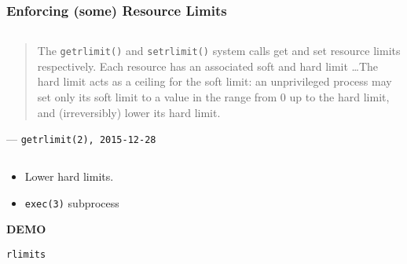 \begin{frame}

\frametitle{Enforcing (some) Resource Limits}

\begin{columns}

\column{\dimexpr\paperwidth-50pt}

\begin{flushright}

\begin{quote}

The \texttt{getrlimit()} and \texttt{setrlimit()} system calls get and set
resource limits respectively.  Each resource has an associated soft and hard
limit \ldots The hard limit acts as a ceiling for the  soft  limit:  an
unprivileged process may set only its soft limit to a value in the range from 0
up to the hard limit, and (irreversibly) lower its hard limit.

\end{quote}

--- \texttt{getrlimit(2), 2015-12-28}

\end{flushright}

\end{columns}

\begin{itemize}

\item Lower hard limits.

\item \texttt{exec(3)} subprocess

\end{itemize}

\end{frame}


\begin{frame}

\begin{center}

\Huge \textbf{DEMO}

\bigskip

\large \texttt{rlimits}

\end{center}

\end{frame}
